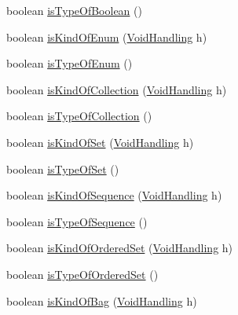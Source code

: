 \begin{DoxyCompactItemize}
\item 
boolean \hyperlink{classorg_1_1tzi_1_1use_1_1uml_1_1mm_1_1_m_classifier_impl_ac44a09b9afb2eb8a8d23863d72ac3811}{is\-Type\-Of\-Boolean} ()
\item 
boolean \hyperlink{classorg_1_1tzi_1_1use_1_1uml_1_1mm_1_1_m_classifier_impl_aa80b35d1d6a840ffccee398abd45c91a}{is\-Kind\-Of\-Enum} (\hyperlink{enumorg_1_1tzi_1_1use_1_1uml_1_1ocl_1_1type_1_1_type_1_1_void_handling}{Void\-Handling} h)
\item 
boolean \hyperlink{classorg_1_1tzi_1_1use_1_1uml_1_1mm_1_1_m_classifier_impl_a9c9209a7dc88c8ed29ea519957e005ef}{is\-Type\-Of\-Enum} ()
\item 
boolean \hyperlink{classorg_1_1tzi_1_1use_1_1uml_1_1mm_1_1_m_classifier_impl_a54f3ea66d2c8f352055f5c272efe6807}{is\-Kind\-Of\-Collection} (\hyperlink{enumorg_1_1tzi_1_1use_1_1uml_1_1ocl_1_1type_1_1_type_1_1_void_handling}{Void\-Handling} h)
\item 
boolean \hyperlink{classorg_1_1tzi_1_1use_1_1uml_1_1mm_1_1_m_classifier_impl_a48d443a2537546865c038b8257600b57}{is\-Type\-Of\-Collection} ()
\item 
boolean \hyperlink{classorg_1_1tzi_1_1use_1_1uml_1_1mm_1_1_m_classifier_impl_ae2d1149bbf15a49541599f5c49308d08}{is\-Kind\-Of\-Set} (\hyperlink{enumorg_1_1tzi_1_1use_1_1uml_1_1ocl_1_1type_1_1_type_1_1_void_handling}{Void\-Handling} h)
\item 
boolean \hyperlink{classorg_1_1tzi_1_1use_1_1uml_1_1mm_1_1_m_classifier_impl_a5040987cf7cc51cd2f135ce8f8227462}{is\-Type\-Of\-Set} ()
\item 
boolean \hyperlink{classorg_1_1tzi_1_1use_1_1uml_1_1mm_1_1_m_classifier_impl_ab6d7f14c5fc630dfe1ef3508231664ca}{is\-Kind\-Of\-Sequence} (\hyperlink{enumorg_1_1tzi_1_1use_1_1uml_1_1ocl_1_1type_1_1_type_1_1_void_handling}{Void\-Handling} h)
\item 
boolean \hyperlink{classorg_1_1tzi_1_1use_1_1uml_1_1mm_1_1_m_classifier_impl_a27af7e9615af89de956c49de56aa3520}{is\-Type\-Of\-Sequence} ()
\item 
boolean \hyperlink{classorg_1_1tzi_1_1use_1_1uml_1_1mm_1_1_m_classifier_impl_aca27a4166eb42f5d135d8c23aa16ac68}{is\-Kind\-Of\-Ordered\-Set} (\hyperlink{enumorg_1_1tzi_1_1use_1_1uml_1_1ocl_1_1type_1_1_type_1_1_void_handling}{Void\-Handling} h)
\item 
boolean \hyperlink{classorg_1_1tzi_1_1use_1_1uml_1_1mm_1_1_m_classifier_impl_ac43a7d4532d8bc8135fce4186517a24e}{is\-Type\-Of\-Ordered\-Set} ()
\item 
boolean \hyperlink{classorg_1_1tzi_1_1use_1_1uml_1_1mm_1_1_m_classifier_impl_a99b6579a1bee0b533a1cd432f4bf2812}{is\-Kind\-Of\-Bag} (\hyperlink{enumorg_1_1tzi_1_1use_1_1uml_1_1ocl_1_1type_1_1_type_1_1_void_handling}{Void\-Handling} h)

\end{DoxyCompactItemize}
